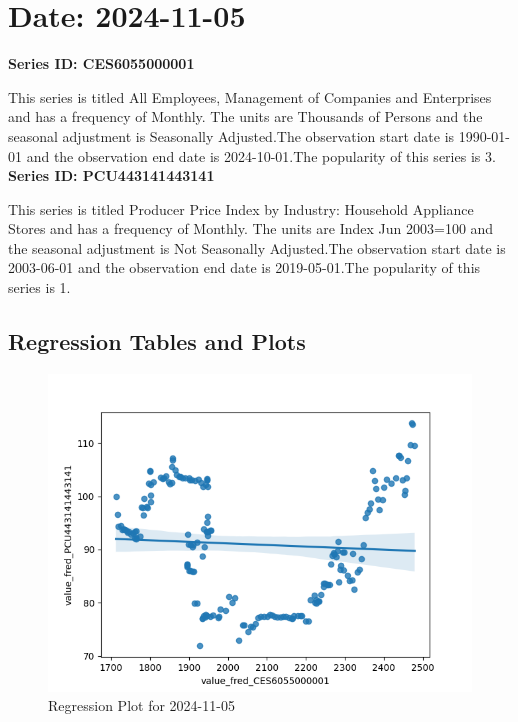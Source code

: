 \section{Date: 2024-11-05}
\noindent \textbf{Series ID: CES6055000001} 

\noindent This series is titled All Employees, Management of Companies and Enterprises and has a frequency of Monthly. The units are Thousands of Persons and the seasonal adjustment is Seasonally Adjusted.The observation start date is 1990-01-01 and the observation end date is 2024-10-01.The popularity of this series is 3. \\ 

\noindent \textbf{Series ID: PCU443141443141} 

\noindent This series is titled Producer Price Index by Industry: Household Appliance Stores and has a frequency of Monthly. The units are Index Jun 2003=100 and the seasonal adjustment is Not Seasonally Adjusted.The observation start date is 2003-06-01 and the observation end date is 2019-05-01.The popularity of this series is 1. \\ 

\subsection{Regression Tables and Plots}


\begin{figure}
\centering
\includegraphics[scale = 0.9]{plots/plot_2024-11-05.png}
\caption{Regression Plot for 2024-11-05}
\end{figure}
\newpage
